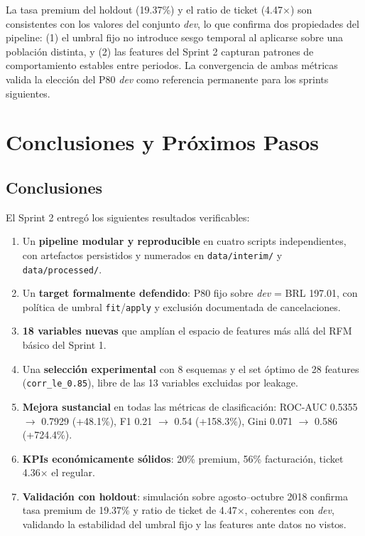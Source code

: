 \documentclass[journal,letterpaper]{IEEEtran}
\begin{document}
La tasa premium del holdout (19.37\%) y el ratio de ticket (4.47×) son consistentes con los valores del conjunto \textit{dev}, lo que confirma dos propiedades del pipeline: (1) el umbral fijo no introduce sesgo temporal al aplicarse sobre una población distinta, y (2) las features del Sprint 2 capturan patrones de comportamiento estables entre periodos. La convergencia de ambas métricas valida la elección del P80 \textit{dev} como referencia permanente para los sprints siguientes.

\section{Conclusiones y Próximos Pasos}
\subsection{Conclusiones}
El Sprint 2 entregó los siguientes resultados verificables:
\begin{enumerate}
    \item Un \textbf{pipeline modular y reproducible} en cuatro scripts independientes, con artefactos persistidos y numerados en \texttt{data/interim/} y \texttt{data/processed/}.
    \item Un \textbf{target formalmente defendido}: P80 fijo sobre \textit{dev} = BRL 197.01, con política de umbral \texttt{fit}/\texttt{apply} y exclusión documentada de cancelaciones.
    \item \textbf{18 variables nuevas} que amplían el espacio de features más allá del RFM básico del Sprint 1.
    \item Una \textbf{selección experimental} con 8 esquemas y el set óptimo de 28 features (\texttt{corr\_le\_0.85}), libre de las 13 variables excluidas por leakage.
    \item \textbf{Mejora sustancial} en todas las métricas de clasificación: ROC-AUC 0.5355 $\to$ 0.7929 (+48.1\%), F1 0.21 $\to$ 0.54 (+158.3\%), Gini 0.071 $\to$ 0.586 (+724.4\%).
    \item \textbf{KPIs económicamente sólidos}: 20\% premium, 56\% facturación, ticket 4.36× el regular.
    \item \textbf{Validación con holdout}: simulación sobre agosto--octubre 2018 confirma tasa premium de 19.37\% y ratio de ticket de 4.47×, coherentes con \textit{dev}, validando la estabilidad del umbral fijo y las features ante datos no vistos.
\end{enumerate}
\end{document}
